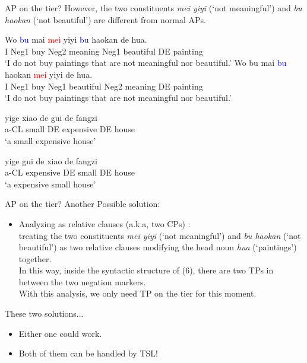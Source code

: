 \documentclass[professionalfonts, xcolor={usenames,svgnames,x11names,table}]{beamer}
\begin{document}
 \begin{frame}{AP on the tier?}
\textcolor{cadmiumgreen}{However, the two constituents \textit{mei yiyi} (`not meaningful') and \textit{bu haokan} (`not beautiful') are different from normal APs. }
\begin{exe}
\gll Wo  \textcolor{blue}{bu}  mai  \textcolor{red}{mei}  yiyi  \textcolor{blue}{bu}  haokan  de  hua. \\
                     I  Neg1  buy  Neg2  meaning  Neg1  beautiful  DE  painting \\
                \glt `I do not buy paintings that are not meaningful nor beautiful.'
 \pause               
\ex \gll Wo  bu  mai  \textcolor{blue}{bu}  haokan  \textcolor{red}{mei}  yiyi  de  hua. \\
                     I  Neg1  buy  Neg1  beautiful  Neg2  meaning  DE  painting \\
                \glt `I do not buy paintings that are not meaningful nor beautiful.'
\pause

\ex
\begin{xlist}
\ex \gll yige  xiao  de  gui  de  fangzi \\
            a-CL  small  DE  expensive  DE  house \\
                \glt `a small expensive house'
  
\ex \gll yige  gui  de  xiao  de  fangzi \\
            a-CL  expensive  DE  small  DE  house \\
                \glt `a expensive small house'
\end{xlist}                
\end{exe}

\end{frame}

 
  \begin{frame}{AP on the tier?}
Another Possible solution:\\
\begin{itemize}
\item Analyzing as relative clauses (a.k.a, two CPs) : \\treating the two constituents \textit{mei yiyi} (`not meaningful') and \textit{bu haokan} (`not beautiful') as two relative clauses modifying the head noun \textit{hua} (`paintings') together. \\
In this way, inside the syntactic structure of (6), there are two TPs in between the two negation markers.\\
With this analysis, we only need TP on the tier for this moment. 
\end{itemize}
\pause

\begin{alertblock}{These two solutions...}
\begin{itemize}
\item Either one could work. 
\item Both of them can be handled by TSL!
\end{itemize}
\end{alertblock}
 \end{frame}
 
\end{document}
